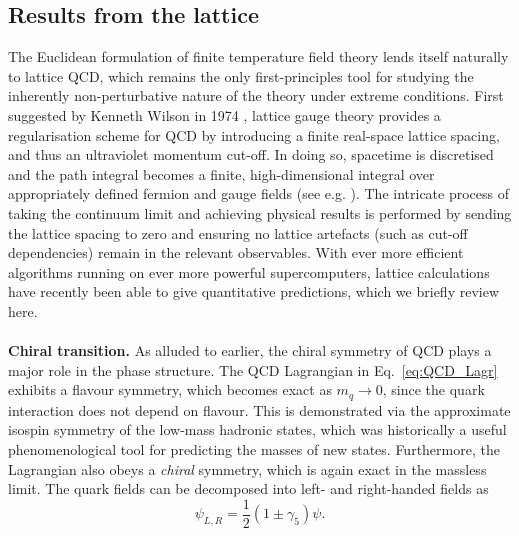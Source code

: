 \documentclass[11pt, a4paper, twoside]{book}
\newcommand{\brac}[1] {\!\left(#1\right)}
\begin{document}
\subsection{Results from the lattice}
\label{sec:latticeQCD}
The Euclidean formulation of finite temperature field theory lends itself naturally to lattice QCD, which remains the only first-principles tool for studying the inherently non-perturbative nature of the theory under extreme conditions. First suggested by Kenneth Wilson in 1974 \cite{Wilson:1974sk}, lattice gauge theory provides a regularisation scheme for QCD by introducing a finite real-space lattice spacing, and thus an ultraviolet momentum cut-off. In doing so, spacetime is discretised and the path integral becomes a finite, high-dimensional integral over appropriately defined fermion and gauge fields (see e.g. \cite{Rothe:1992nt}). The intricate process of taking the continuum limit and achieving physical results is performed by sending the lattice spacing to zero and ensuring no lattice artefacts (such as cut-off dependencies) remain in the relevant observables. With ever more efficient algorithms running on ever more powerful supercomputers, lattice calculations have recently been able to give quantitative predictions, which we briefly review here.
\\
\\
\textbf{Chiral transition.} As alluded to earlier, the chiral symmetry of QCD plays a major role in the phase structure. The QCD Lagrangian in Eq.~\eqref{eq:QCD_Lagr} exhibits a flavour symmetry, which becomes exact as \(m_q\to 0\), since the quark interaction does not depend on flavour. This is demonstrated via the approximate isospin symmetry of the low-mass hadronic states, which was historically a useful phenomenological tool for predicting the masses of new states. Furthermore, the Lagrangian also obeys a \emph{chiral} symmetry, which is again exact in the massless limit. The quark fields can be decomposed into left- and right-handed fields as \cite{Peskin:1995ev}
\begin{equation}
\label{eq:chiral_quark}
\psi_{L,R}=\frac{1}{2}\brac{1\pm\gamma_5}\psi.
\end{equation}
\end{document}

